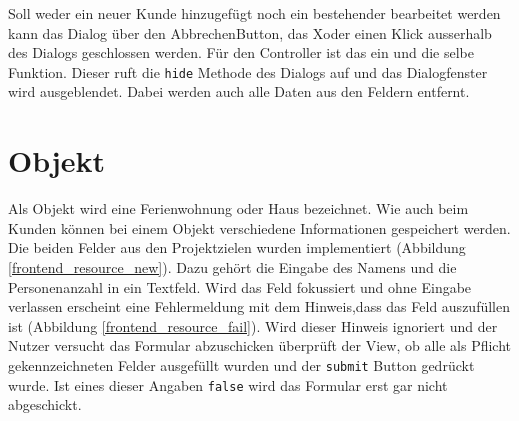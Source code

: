 Soll weder ein neuer Kunde hinzugefügt noch ein bestehender bearbeitet werden kann das Dialog über den \grqq Abbrechen\glqq  Button, das \grqq X\glqq  oder einen
Klick ausserhalb des Dialogs geschlossen werden. Für den Controller ist das ein und die selbe Funktion. Dieser ruft die \texttt{hide} Methode des Dialogs auf und
das Dialogfenster wird ausgeblendet. Dabei werden auch alle Daten aus den Feldern entfernt.


\section{Objekt}
Als Objekt wird eine Ferienwohnung oder Haus bezeichnet. Wie auch beim Kunden können bei einem Objekt verschiedene Informationen gespeichert werden. Die beiden Felder aus den Projektzielen wurden implementiert (Abbildung \ref{frontend_resource_new}). Dazu gehört die Eingabe des Namens und die Personenanzahl in ein Textfeld. Wird das Feld fokussiert und ohne Eingabe verlassen erscheint eine Fehlermeldung mit dem Hinweis,dass das Feld auszufüllen ist (Abbildung \ref{frontend_resource_fail}). Wird dieser Hinweis ignoriert und der Nutzer versucht das Formular abzuschicken überprüft der View, ob alle als Pflicht gekennzeichneten Felder ausgefüllt wurden und der \texttt{submit} Button gedrückt wurde. Ist eines dieser Angaben \texttt{false} wird das Formular erst gar nicht abgeschickt.

